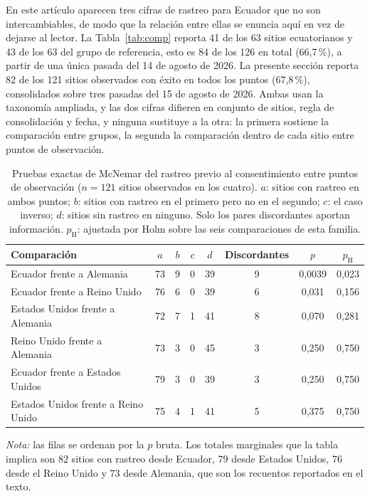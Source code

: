 \documentclass[pdflatex,sn-basic,Numbered,iicol]{sn-jnl}
\theoremstyle{thmstyleone}
\theoremstyle{thmstyletwo}
\theoremstyle{thmstylethree}
\begin{document}
En este art\'iculo aparecen tres cifras de rastreo para Ecuador que no son intercambiables, de modo que la relaci\'on entre ellas se enuncia aqu\'i en vez de dejarse al lector. La Tabla~\ref{tab:comp} reporta 41 de los 63 sitios ecuatorianos y 43 de los 63 del grupo de referencia, esto es 84 de los 126 en total (66,7\,\%), a partir de una \'unica pasada del 14 de agosto de 2026. La presente secci\'on reporta 82 de los 121 sitios observados con \'exito en todos los puntos (67,8\,\%), consolidados sobre tres pasadas del 15 de agosto de 2026. Ambas usan la taxonom\'ia ampliada, y las dos cifras difieren en conjunto de sitios, regla de consolidaci\'on y fecha, y ninguna sustituye a la otra: la primera sostiene la comparaci\'on entre grupos, la segunda la comparaci\'on dentro de cada sitio entre puntos de observaci\'on.

\begin{table}[htbp]
	\centering
	\caption{Pruebas exactas de McNemar del rastreo previo al consentimiento entre puntos de observaci\'on ($n=121$ sitios observados en los cuatro). $a$: sitios con rastreo en ambos puntos; $b$: sitios con rastreo en el primero pero no en el segundo; $c$: el caso inverso; $d$: sitios sin rastreo en ninguno. Solo los pares discordantes aportan informaci\'on. $p_{\text{H}}$: ajustada por Holm sobre las seis comparaciones de esta familia.}\label{tab:vantage}
	\small
	\begin{tabular}{@{}lccccccc@{}}
		\toprule
		\textbf{Comparaci\'on} & $a$ & $b$ & $c$ & $d$ & \textbf{Discordantes} & \textbf{$p$} & \textbf{$p_{\text{H}}$} \\
		\midrule
		Ecuador frente a Alemania & 73 & 9 & 0 & 39 & 9 & 0,0039 & 0,023 \\
		Ecuador frente a Reino Unido & 76 & 6 & 0 & 39 & 6 & 0,031 & 0,156 \\
		Estados Unidos frente a Alemania & 72 & 7 & 1 & 41 & 8 & 0,070 & 0,281 \\
		Reino Unido frente a Alemania & 73 & 3 & 0 & 45 & 3 & 0,250 & 0,750 \\
		Ecuador frente a Estados Unidos & 79 & 3 & 0 & 39 & 3 & 0,250 & 0,750 \\
		Estados Unidos frente a Reino Unido & 75 & 4 & 1 & 41 & 5 & 0,375 & 0,750 \\
		\bottomrule
	\end{tabular}
	\par\vspace{3pt}
	\footnotesize\RaggedRight\textit{Nota:} las filas se ordenan por la $p$ bruta. Los totales marginales que la tabla implica son 82 sitios con rastreo desde Ecuador, 79 desde Estados Unidos, 76 desde el Reino Unido y 73 desde Alemania, que son los recuentos reportados en el texto.
\end{table}
\end{document}
